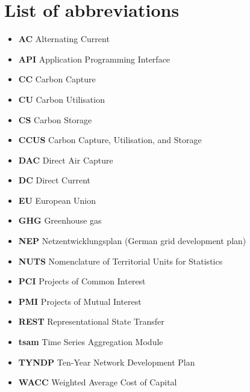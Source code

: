 \documentclass[preprint,12pt,sort&compress]{elsarticle}
\begin{document}


\section*{List of abbreviations}

\begin{itemize}[left=0pt, label={}, itemsep=0pt, parsep=0pt, topsep=0pt]
  \item \textbf{AC} \enspace Alternating Current
  \item \textbf{API} \enspace Application Programming Interface
  \item \textbf{CC} \enspace Carbon Capture
  \item \textbf{CU} \enspace Carbon Utilisation
  \item \textbf{CS} \enspace Carbon Storage
  \item \textbf{CCUS} \enspace Carbon Capture, Utilisation, and Storage
  \item \textbf{DAC} \enspace Direct Air Capture
  \item \textbf{DC} \enspace Direct Current
  \item \textbf{EU} \enspace European Union
  \item \textbf{GHG} \enspace Greenhouse gas
  \item \textbf{NEP} \enspace Netzentwicklungsplan (German grid development plan)
  \item \textbf{NUTS} \enspace Nomenclature of Territorial Units for Statistics
  \item \textbf{PCI} \enspace Projects of Common Interest
  \item \textbf{PMI} \enspace Projects of Mutual Interest
  \item \textbf{REST} \enspace Representational State Transfer 
  \item \textbf{tsam} \enspace Time Series Aggregation Module
  \item \textbf{TYNDP} \enspace Ten-Year Network Development Plan
  \item \textbf{WACC} \enspace Weighted Average Cost of Capital

\end{itemize}
\end{document}
